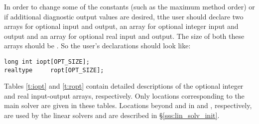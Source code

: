 In order to change some of the {\cvodes} constants (such as the maximum method order) 
or if additional diagnostic output values are desired, tthe user should declare two 
arrays for optional input and output, an  array for optional integer 
input and output and an  array for optional real input and output. 
The size of both these arrays should be .
So the user's declarations should look like:
\begin{verbatim}
long int iopt[OPT_SIZE];
realtype     ropt[OPT_SIZE];
\end{verbatim}
Tables \ref{t:iopt} and \ref{t:ropt} contain 
detailed descriptions of the optional integer and real input-output arrays,
respectively. Only locations corresponding to the main {\cvodes} solver are 
given in these tables. Locations beyond  and
 in  and , respectively, are used
by the linear solvers and are described in \S\ref{sss:lin_solv_init}.

